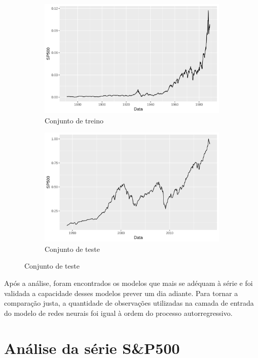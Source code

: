 \documentclass[
    12pt,
    oneside,
    a4paper,
    english,
    brazil
]{abntex2}
\begin{document}
\begin{figure}[ht]
    \caption{Divisão da série entre os conjuntos de treino e teste}\label{fig:traintest}
    \begin{subfigure}{.5\textwidth}
        \centering
        \includegraphics[width=.8\linewidth]{images/SP500_train.png}
        \caption{Conjunto de treino}
    \end{subfigure}
    \begin{subfigure}{.5\textwidth}
        \centering
        \includegraphics[width=.8\linewidth]{images/SP500_test.png}
        \caption{Conjunto de teste}
    \end{subfigure}
\end{figure}

Após a análise, foram encontrados os modelos  que mais se adéquam à série e foi
validada  a capacidade  desses modelos  prever um  dia adiante.  Para tornar  a
comparação justa, a  quantidade de observações utilizadas na  camada de entrada
do modelo de redes neurais foi igual à ordem do processo autorregressivo.

\section{Análise da série S\&P500}
\end{document}
